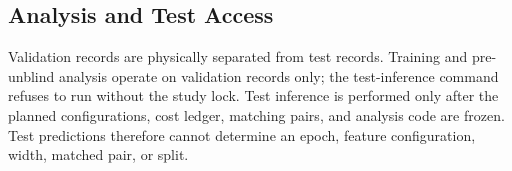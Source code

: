 \subsection{Analysis and Test Access}
Validation records are physically separated from test records. Training and
pre-unblind analysis operate on validation records only; the test-inference
command refuses to run without the study lock. Test inference is performed
only after the planned configurations, cost ledger, matching pairs, and
analysis code are frozen. Test predictions therefore cannot determine an
epoch, feature configuration, width, matched pair, or split.
